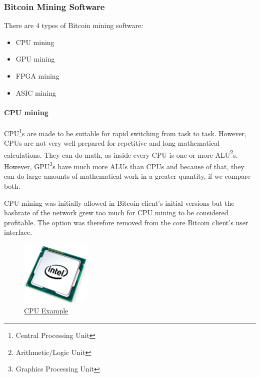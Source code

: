 \documentclass{article}
\newcommand\tab[1][1cm]{\hspace*{#1}}
\begin{document}
\subsubsection{Bitcoin Mining Software}

There are 4 types of Bitcoin mining software:

\begin{itemize}
 \item CPU mining
 \item GPU mining
 \item FPGA mining
 \item ASIC mining
\end{itemize}

\paragraph{CPU mining}

\tab CPU\footnote{Central Processing Unit}s are made to be suitable for rapid switching from task to task. However, CPUs are not very well prepared for repetitive and long mathematical calculations. They can do math, as inside every CPU is one or more ALU\footnote{Arithmetic/Logic Unit}s. However, GPU\footnote{Graphics Processing Unit}s have much more ALUs than CPUs and because of that, they can do large amounts of mathematical work in a greater quantity, if we compare both.

CPU mining was initially allowed in Bitcoin client’s initial versions but the hashrate of the network grew too much for CPU mining to be considered profitable. The option was therefore removed from the core Bitcoin client's user interface.

\begin{figure}[H]
    \begin{center}
        \includegraphics[width=0.3\textwidth]{images/cpu.jpeg}
        \caption{\href{https://www.pugetsystems.com/labs/articles/Estimating-CPU-Performance-using-Amdahls-Law-619/}{\underline{CPU Example}}}
    \end{center}
\end{figure}
\end{document}
